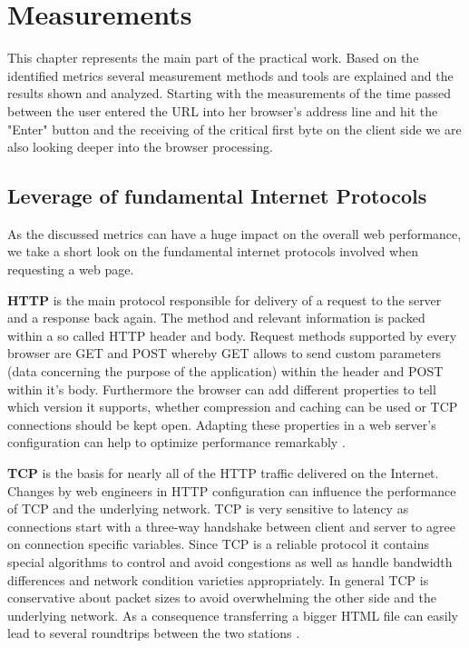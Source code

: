 \chapter{Measurements}
\label{chap:measurements}

This chapter represents the main part of the practical work. Based on the identified metrics several measurement methods and tools are explained and the results shown and analyzed. Starting with the measurements of the time passed between the user entered the URL into her browser's address line and hit the "Enter" button and the receiving of the critical first byte on the client side we are also looking deeper into the browser processing.

\section{Leverage of fundamental Internet Protocols}
As the discussed metrics can have a huge impact on the overall web performance, we take a short look on the fundamental internet protocols involved when requesting a web page. 

\textbf{HTTP} is the main protocol responsible for delivery of a request to the server and a response back again. The method and relevant information is packed within a so called HTTP header and body. Request methods supported by every browser are GET and POST whereby GET allows to send custom parameters (data concerning the purpose of the application) within the header and POST within it's body. Furthermore the browser can add different properties to tell which version it supports, whether compression and caching can be used or TCP connections should be kept open. Adapting these properties in a web server's configuration can help to optimize performance remarkably \cite{Chang_2008}.

\textbf{TCP} is the basis for nearly all of the HTTP traffic delivered on the Internet. Changes by web engineers in HTTP configuration can influence the performance of TCP and the underlying network. TCP is very sensitive to latency as connections start with a three-way handshake between client and server to agree on connection specific variables. Since TCP is a reliable protocol it contains special algorithms to control and avoid congestions as well as handle bandwidth differences and network condition varieties appropriately. In general TCP is conservative about packet sizes to avoid overwhelming the other side and the underlying network. As a consequence transferring a bigger HTML file can easily lead to several roundtrips between the two stations \cite{Grigorik_2013}. 

